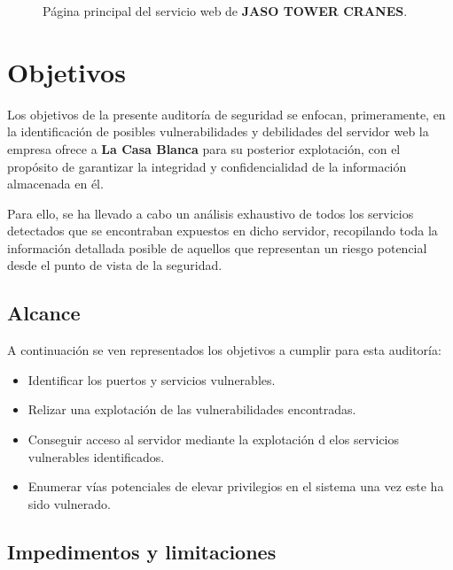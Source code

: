 \documentclass[a4paper]{article} %
\newcommand{\companyName}{JASO TOWER CRANES}
\begin{document}
  \vspace{0.5cm}

  \begin{figure}[h]
    \centering
    \setlength{\fboxrule}{0.8pt}
    \caption{Página principal del servicio web de \textbf{\companyName}.}
  \end{figure}

  \section{Objetivos}

  Los objetivos de la presente auditoría de seguridad se enfocan, primeramente, en la identificación de posibles vulnerabilidades y debilidades del servidor web la empresa \textbf{\color{bluePortada}{\companyName}} ofrece a \textbf{La Casa Blanca} para su posterior explotación, con el propósito de garantizar la integridad y confidencialidad de la información almacenada en él.

  Para ello, se ha llevado a cabo un análisis exhaustivo de todos los servicios detectados que se encontraban expuestos en dicho servidor, recopilando toda la información detallada posible de aquellos que representan un riesgo potencial desde el punto de vista de la seguridad.

  \clearpage
  \subsection{Alcance}

  A continuación se ven representados los objetivos a cumplir para esta auditoría:

  \begin{itemize}
    \item Identificar los puertos y servicios vulnerables.
    \item Relizar una explotación de las vulnerabilidades encontradas.
    \item Conseguir acceso al servidor mediante la explotación d elos servicios vulnerables identificados.
    \item Enumerar vías potenciales de elevar privilegios en el sistema una vez este ha sido vulnerado.
  \end{itemize}

  \subsection{Impedimentos y limitaciones}
  
\end{document}

